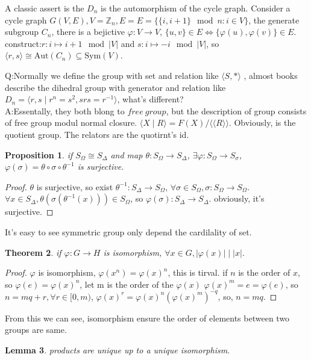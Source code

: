 \documentclass[10pt,a4paper]{article}
\newtheorem{theorem}{Theorem}[section]
\newtheorem{lemma}[theorem]{Lemma}
\newtheorem{proposition}[theorem]{Proposition}
\begin{document}
A classic assert is the $D_n$ is the automorphism of the cycle graph. Consider a cycle graph $G(V,E),V=\mathbb{Z}_n,E=E=\{\{i,i+1\}\mod n:i\in V\}$, the generate subgroup $C_n$, 
there is a bejictive $\varphi:V\to V$, $\{u,v\}\in E\iff\{\varphi(u),\varphi(v)\}\in E$.
construct:$r:i\mapsto i+1\mod|V|$ and $s:i\mapsto -i\mod|V|$, so $\langle r,s\rangle\cong\mathrm{Aut}(C_n)\subseteq\mathrm{Sym}(V)$.

Q:Normally we define the group with set and relation like $\langle S,*\rangle$ , 
almost books describe the dihedral group with generator and relation like $D_n=\langle r,s\mid r^n=s^2,srs=r^{-1}\rangle$, 
what's different?\\
A:Essentally, they both blong to $free\:group$, but the description of group consists of free group modul normal closure.
$\langle X\mid R\rangle=F(X)/\langle\langle R\rangle\rangle$. Obviously, is the quotient group. The relators are the quotirnt's id.
\begin{proposition}
    if $S_{\Omega}\cong S_{\Delta}$ and map $\theta:S_{\Omega}\to S_{\Delta}$, $\exists\varphi:S_{\Omega}\to S_{\sigma}$, $\varphi(\sigma)=\theta\circ\sigma\circ\theta^{-1}$ is surjective.
\end{proposition}
\begin{proof}
    $\theta$ is surjective, so exist $\theta^{-1}:S_{\Delta}\to S_{\Omega}$, $\forall\sigma\in S_{\Omega},\sigma:S_{\Omega}\to S_{\Omega}$.
    $\forall x\in S_{\Delta},\theta(\sigma(\theta^{-1}(x)))\in S_{\Omega}$, so $\varphi(\sigma):S_{\Delta}\to S_{\Delta}$. obviously, it's surjective.
\end{proof}
It's easy to see symmetric group only depend the cardilality of set.\\
\begin{theorem}
    if $\varphi:G\to H$ is isomorphism, $\forall x\in G,|\varphi(x)|\mid|x|$.
\end{theorem}
\begin{proof}
    $\varphi$ is isomorphism, $\varphi(x^n)=\varphi(x)^n$, this is tirval.
    if $n$ is the order of $x$, so $\varphi(e)=\varphi(x)^n$, let m is the order of the $\varphi(x)$
    $\varphi(x)^m=e=\varphi(e)$, so $n=mq+r,\forall r\in[0,m)$, $\varphi(x)^r=\varphi(x)^n(\varphi(x)^m)^{-q}$,
    so, $n=mq$.
\end{proof}
From this we can see, isomorphism ensure the order of elements between two groups are same.
\begin{lemma}
    products are unique up to a unique isomorphism.
\end{lemma}
\end{document}
